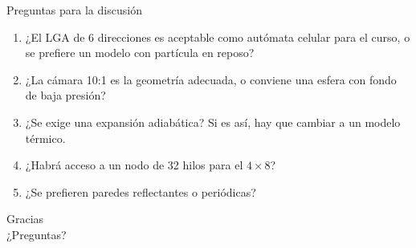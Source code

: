 \documentclass[aspectratio=169]{beamer}
\begin{document}
\begin{frame}{Preguntas para la discusión}
  \begin{enumerate}
    \item ¿El LGA de 6 direcciones es aceptable como autómata celular para el
          curso, o se prefiere un modelo con partícula en reposo?
    \item ¿La cámara 10:1 es la geometría adecuada, o conviene una esfera con
          fondo de baja presión?
    \item ¿Se exige una expansión adiabática? Si es así, hay que cambiar a un
          modelo térmico.
    \item ¿Habrá acceso a un nodo de 32 hilos para el $4\times8$?
    \item ¿Se prefieren paredes reflectantes o periódicas?
  \end{enumerate}
\end{frame}

\begin{frame}
  \centering
  \Huge Gracias\\[4mm]
  \normalsize ¿Preguntas?
\end{frame}
\end{document}
